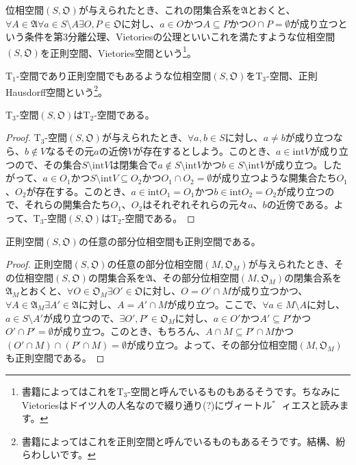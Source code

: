 \documentclass[dvipdfmx]{jsarticle}
\begin{document}
\begin{dfn}
位相空間$\left( S,\mathfrak{O} \right)$が与えられたとき、これの閉集合系を$\mathfrak{A}$とおくと、$\forall A \in \mathfrak{A\forall}a \in S \setminus A\exists O,P \in \mathfrak{O}$に対し、$a \in O$かつ$A \subseteq P$かつ$O \cap P = \emptyset$が成り立つという条件を第3分離公理、Vietoriesの公理といいこれを満たすような位相空間$\left( S,\mathfrak{O} \right)$を正則空間、Vietories空間という\footnote{書籍によってはこれを$\mathrm{T}_{3}$-空間と呼んでいるものもあるそうです。ちなみにVietoriesはドイツ人の人名なので綴り通り(?)にヴィートル゛ィエスと読みます。}。
\end{dfn}
\begin{dfn}
$\mathrm{T}_{1}$-空間であり正則空間でもあるような位相空間$\left( S,\mathfrak{O} \right)$を$\mathrm{T}_{3}$-空間、正則Hausdorff空間という\footnote{書籍によってはこれを正則空間と呼んでいるものもあるそうです。結構、紛らわしいです。}。
\end{dfn}
\begin{thm}\label{8.1.7.10}
$\mathrm{T}_{3}$-空間$\left( S,\mathfrak{O} \right)$は$\mathrm{T}_{2}$-空間である。
\end{thm}
\begin{proof}
$\mathrm{T}_{3}$-空間$\left( S,\mathfrak{O} \right)$が与えられたとき、$\forall a,b \in S$に対し、$a \neq b$が成り立つなら、$b \notin V$なるその元$a$の近傍$V$が存在するとしよう。このとき、$a \in {\mathrm{int}}V$が成り立つので、その集合$S \setminus {\mathrm{int}}V$は閉集合で$a \notin S \setminus {\mathrm{int}}V$かつ$b \in S \setminus {\mathrm{int}}V$が成り立つ。したがって、$a \in O_{1}$かつ$S \setminus {\mathrm{int}}V \subseteq O_{2}$かつ$O_{1} \cap O_{2} = \emptyset$が成り立つような開集合たち$O_{1}$、$O_{2}$が存在する。このとき、$a \in {\mathrm{int}}O_{1} = O_{1}$かつ$b \in {\mathrm{int}}O_{2} = O_{2}$が成り立つので、それらの開集合たち$O_{1}$、$O_{2}$はそれぞれそれらの元々$a$、$b$の近傍である。よって、$\mathrm{T}_{3}$-空間$\left( S,\mathfrak{O} \right)$は$\mathrm{T}_{2}$-空間である。
\end{proof}
\begin{thm}\label{8.1.7.11}
正則空間$\left( S,\mathfrak{O} \right)$の任意の部分位相空間も正則空間である。
\end{thm}
\begin{proof}
正則空間$\left( S,\mathfrak{O} \right)$の任意の部分位相空間$\left( M,\mathfrak{O}_{M} \right)$が与えられたとき、その位相空間$\left( S,\mathfrak{O} \right)$の閉集合系を$\mathfrak{A}$、その部分位相空間$\left( M,\mathfrak{O}_{M} \right)$の閉集合系を$\mathfrak{A}_{M}$とおくと、$\forall O \in \mathfrak{O}_{M}\exists O'\in \mathfrak{O}$に対し、$O = O' \cap M$が成り立つかつ、$\forall A \in \mathfrak{A}_{M}\exists A'\in \mathfrak{A}$に対し、$A = A' \cap M$が成り立つ。ここで、$\forall a \in M \setminus A$に対し、$a \in S \setminus A'$が成り立つので、$\exists O',P' \in \mathfrak{O}_{M}$に対し、$a \in O'$かつ$A' \subseteq P'$かつ$O' \cap P' = \emptyset$が成り立つ。このとき、もちろん、$A \cap M \subseteq P' \cap M$かつ$\left( O' \cap M \right) \cap \left( P' \cap M \right) = \emptyset$が成り立つ。よって、その部分位相空間$\left( M,\mathfrak{O}_{M} \right)$も正則空間である。
\end{proof}
\end{document}
